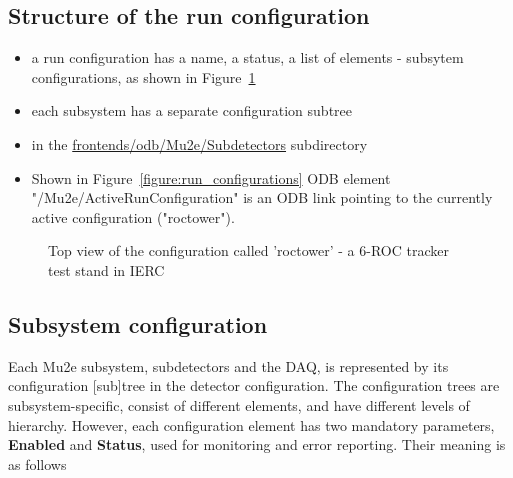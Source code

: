 \subsection{Structure of  the run configuration}
\begin{itemize}
\item 
  a run configuration has a name, a status, a list of elements - subsytem configurations,
   as shown in Figure~\ref{figure:configuration_top}
\item
  each subsystem has a separate configuration subtree
\item
   in the 
  \href{https://github.com/pavel1murat/frontends/tree/main/odb/Mu2e/Subdetectors}
  {\blue frontends/odb/Mu2e/Subdetectors} subdirectory
\item
  Shown in  Figure~\ref{figure:run_configurations} ODB element "/Mu2e/ActiveRunConfiguration" is an ODB link
  pointing to the currently active configuration ("roctower").
\end{itemize}

\begin{figure}[H]
  \caption{
    \label{figure:configuration_top}
    Top view of the configuration called 'roctower' - a 6-ROC tracker test stand in IERC
  }
\end{figure}

\subsection{Subsystem configuration}

Each Mu2e subsystem, subdetectors and the DAQ, is represented by its
configuration [sub]tree in the detector configuration.
The configuration trees are subsystem-specific, consist of different elements,
and have different levels of hierarchy.
However, each configuration element has two mandatory parameters, {\bf Enabled}
and {\bf Status}, used for monitoring and error reporting.
Their meaning is as follows 

